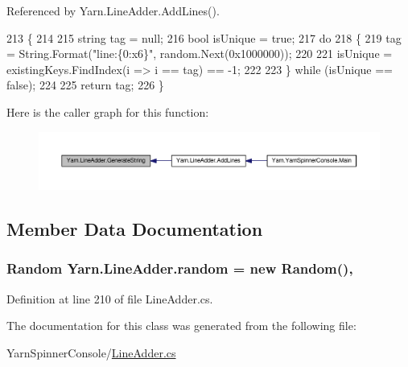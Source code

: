 Referenced by Yarn.\-Line\-Adder.\-Add\-Lines().


\begin{DoxyCode}
213                                                                 \{
214 
215             \textcolor{keywordtype}{string} tag = null;
216             \textcolor{keywordtype}{bool} isUnique = \textcolor{keyword}{true};
217             \textcolor{keywordflow}{do}
218             \{
219                 tag = String.Format(\textcolor{stringliteral}{"line:\{0:x6\}"}, random.Next(0x1000000));
220 
221                 isUnique = existingKeys.FindIndex(i => i == tag) == -1;
222 
223             \} \textcolor{keywordflow}{while} (isUnique == \textcolor{keyword}{false});
224 
225             \textcolor{keywordflow}{return} tag;
226         \}
\end{DoxyCode}


Here is the caller graph for this function\-:
\nopagebreak
\begin{figure}[H]
\begin{center}
\leavevmode
\includegraphics[width=350pt]{a00120_a91ad68b679bd3b0bd89fe92ea5068688_icgraph}
\end{center}
\end{figure}




\subsection{Member Data Documentation}
\hypertarget{a00120_ad887744b1b813fc081be814958742c37}{
\subsubsection[{random}]{\setlength{\rightskip}{0pt plus 5cm}Random Yarn.\-Line\-Adder.\-random = new Random()\hspace{0.3cm}{\ttfamily [static]}, {\ttfamily [private]}}}\label{a00120_ad887744b1b813fc081be814958742c37}


Definition at line 210 of file Line\-Adder.\-cs.



The documentation for this class was generated from the following file\-:\begin{DoxyCompactItemize}
\item 
Yarn\-Spinner\-Console/\hyperlink{a00306}{Line\-Adder.\-cs}\end{DoxyCompactItemize}
